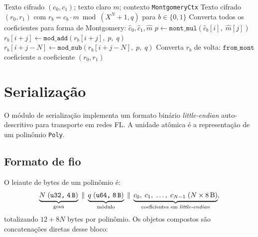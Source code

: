 \documentclass[11pt,a4paper]{report}
\begin{document}
\begin{algorithm}[ht]
\caption{\texttt{mul\_plain}: multiplicação escolar negacíclica em domínio de Montgomery}
\label{alg:mul_plain}
\begin{algorithmic}[1]
\Require Texto cifrado $(c_0, c_1)$;\; texto claro $m$;\; contexto \texttt{MontgomeryCtx}
\Ensure Texto cifrado $(r_0, r_1)$ com $r_b = c_b \cdot m \bmod (X^N+1, q)$ para $b \in \{0,1\}$
\State Converta todos os coeficientes para forma de Montgomery: $\hat{c}_0, \hat{c}_1, \hat{m}$
      \State $p \gets \texttt{mont\_mul}(\hat{c}_b[i],\; \hat{m}[j])$
        \State $r_b[i+j] \gets \texttt{mod\_add}(r_b[i+j],\; p,\; q)$
      \Else
        \State $r_b[i+j-N] \gets \texttt{mod\_sub}(r_b[i+j-N],\; p,\; q)$
      \EndIf
    \EndFor
  \EndFor
  \State Converta $r_b$ de volta: $\texttt{from\_mont}$ coeficiente a coeficiente
\EndFor
\State \Return $(r_0, r_1)$
\end{algorithmic}
\end{algorithm}

\chapter{Serialização}
\label{cap:serialization}

O módulo de serialização implementa um formato binário \emph{little-endian}
auto-descritivo para transporte em redes FL. A unidade atômica é a representação de
um polinômio \texttt{Poly}.

\section{Formato de fio}
\label{sec:wire_format}

O leiaute de bytes de um polinômio é:
\begin{equation}
  \underbrace{N\;(\texttt{u32,\;4\,B})}_{\text{grau}}
  \;\|\;
  \underbrace{q\;(\texttt{u64,\;8\,B})}_{\text{módulo}}
  \;\|\;
  \underbrace{c_0,\;c_1,\;\ldots,\;c_{N-1}\;(N \times 8\,\text{B})}_{\text{coeficientes em }
    \emph{little-endian}},
  \label{eq:poly_wire}
\end{equation}
totalizando $12 + 8N$ bytes por polinômio. Os objetos compostos são concatenações
diretas desse bloco:
\end{document}
